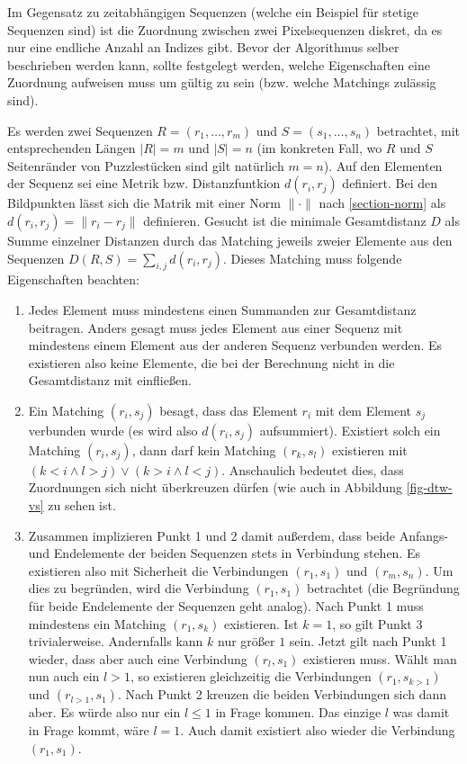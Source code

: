 \documentclass{whswinvcbook}
\begin{document}
Im Gegensatz zu zeitabhängigen Sequenzen (welche ein Beispiel für stetige Sequenzen sind) ist die Zuordnung zwischen zwei Pixelsequenzen diskret, da es nur eine endliche Anzahl an Indizes gibt. Bevor der Algorithmus selber beschrieben werden kann, sollte festgelegt werden, welche Eigenschaften eine Zuordnung aufweisen muss um gültig zu sein (bzw. welche Matchings zulässig sind).

Es werden zwei Sequenzen $R=(r_1,\dots,r_m)$ und $S=(s_1,\dots,s_n)$ betrachtet, mit entsprechenden Längen $|R|=m$ und $|S|=n$ (im konkreten Fall, wo $R$ und $S$ Seitenränder von Puzzlestücken sind gilt natürlich $m=n$). Auf den Elementen der Sequenz sei eine Metrik bzw. Distanzfuntkion $d(r_i,r_j)$ definiert. Bei den Bildpunkten lässt sich die Matrik mit einer Norm $\|\cdot\|$ nach \ref{section-norm} als $d(r_i,r_j)=\|r_i-r_j\|$ definieren. Gesucht ist die minimale Gesamtdistanz $D$ als Summe einzelner Distanzen durch das Matching jeweils zweier Elemente aus den Sequenzen $D(R,S)=\sum_{i,j}d(r_i,r_j)$. Dieses Matching muss folgende Eigenschaften beachten:
\begin{enumerate}
    \item Jedes Element muss mindestens einen Summanden zur Gesamtdistanz beitragen. Anders gesagt muss jedes Element aus einer Sequenz mit mindestens einem Element aus der anderen Sequenz verbunden werden. Es existieren also keine Elemente, die bei der Berechnung nicht in die Gesamtdistanz mit einfließen.
    \item Ein Matching $(r_i,s_j)$ besagt, dass das Element $r_i$ mit dem Element $s_j$ verbunden wurde (es wird also $d(r_i,s_j)$ aufsummiert). Existiert solch ein Matching $(r_i,s_j)$, dann darf kein Matching $(r_k,s_l)$ existieren mit $(k<i\land l>j)\lor (k>i\land l<j)$. Anschaulich bedeutet dies, dass Zuordnungen sich nicht überkreuzen dürfen (wie auch in Abbildung \ref{fig-dtw-vs} zu sehen ist.
    \item Zusammen implizieren Punkt 1 und 2 damit außerdem, dass beide Anfangs- und Endelemente der beiden Sequenzen stets in Verbindung stehen. Es existieren also mit Sicherheit die Verbindungen $(r_1,s_1)$ und $(r_m,s_n)$. Um dies zu begründen, wird die Verbindung $(r_1,s_1)$ betrachtet (die Begründung für beide Endelemente der Sequenzen geht analog). Nach Punkt 1 muss mindestens ein Matching $(r_1,s_k)$ existieren. Ist $k=1$, so gilt Punkt 3 trivialerweise. Andernfalls kann $k$ nur größer $1$ sein. Jetzt gilt nach Punkt 1 wieder, dass aber auch eine Verbindung $(r_l,s_1)$ existieren muss. Wählt man nun auch ein $l>1$, so existieren gleichzeitig die Verbindungen $(r_1,s_{k>1})$ und $(r_{l>1},s_1)$. Nach Punkt 2 kreuzen die beiden Verbindungen sich dann aber. Es würde also nur ein $l\leq1$ in Frage kommen. Das einzige $l$ was damit in Frage kommt, wäre $l=1$. Auch damit existiert also wieder die Verbindung $(r_1,s_1)$.
\end{enumerate}
\end{document}
